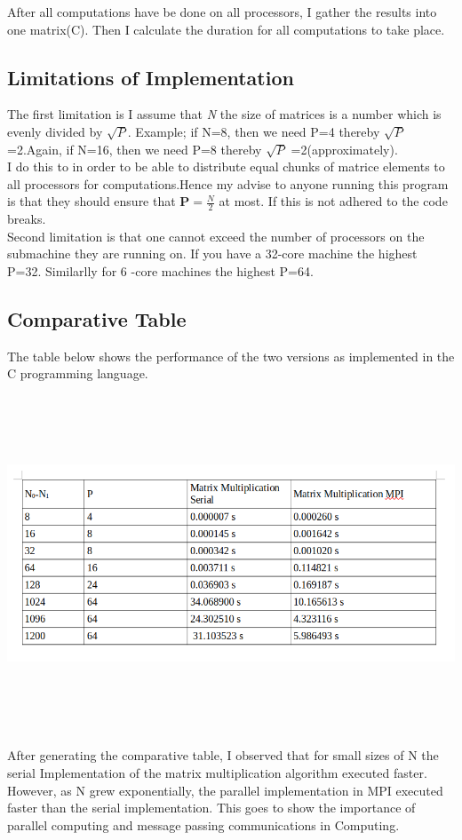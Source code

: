 \documentclass[12pt, a4paper, fleqn, titlepage]{article}
\begin{document}
After all computations have be done on all processors, I gather the results into one matrix(C). Then I calculate the duration for all computations to take place.

\subsection{Limitations of Implementation}
The first limitation is I assume that \emph{N} the size of matrices is a number which is evenly divided by $\sqrt{P}$. Example; if N=8, then we need P=4 thereby $\sqrt{P}$ =2.Again,  if N=16, then we need P=8 thereby $\sqrt{P}$ =2(approximately). \\

I do this to in order to be able to distribute equal chunks of matrice elements to all processors for computations.Hence my advise to anyone running this program is that they should ensure that \textbf{P$= \frac{N}{2}$} at most. If this is not adhered to the code breaks.\\

Second limitation is that one cannot exceed the number of processors on the submachine they are running on. If you have a 32-core machine the highest P=32. Similarlly for 6
-core machines the highest P=64.



\subsection{Comparative Table}
    The table below shows the performance of the two versions as implemented in the C programming language.
    \begin{center}  
        \includegraphics[width= 18cm,height = 10cm, keepaspectratio,scale=0.5]{lab3-table}
    \end{center}

    After generating the comparative table, I observed that for small sizes of N the serial Implementation of the matrix multiplication algorithm executed faster. However, as N grew exponentially, the parallel implementation in MPI executed faster than the serial implementation. This goes to show the importance of parallel computing and message passing communications in Computing.
\end{document}
